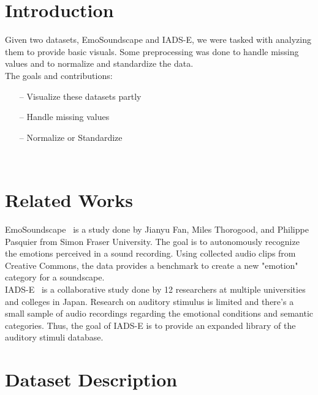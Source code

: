 \documentclass[conference]{IEEEtran}
\begin{document}
{\color{red}
\vspace{-0.1in}
\section{Introduction}
\label{sec:intro}

\noindent
Given two datasets, EmoSoundscape and IADS-E, we were tasked with analyzing them to provide basic visuals. Some preprocessing was done to handle missing values and to normalize and standardize the data. \\

\noindent
The goals and contributions:


\begin{itemize}
    \item[--] Visualize these datasets partly
    \item[--] Handle missing values
    \item[--] Normalize or Standardize
\end{itemize}
\ \

\section{Related Works}

\noindent
EmoSoundscape~\cite{EmoSoundscape} is a study done by Jianyu Fan, Miles Thorogood, and Philippe Pasquier from Simon Fraser University. The goal is to autonomously recognize the emotions perceived in a sound recording. Using collected audio clips from Creative Commons, the data provides a benchmark to create a new "emotion" category for a soundscape. \\

\noindent
IADS-E~\cite{IADSE} is a collaborative study done by 12 researchers at multiple universities and colleges in Japan. Research on auditory stimulus is limited and there's a small sample of audio recordings regarding the emotional conditions and semantic categories. Thus, the goal of IADS-E is to provide an expanded library of the auditory stimuli database. \\

\section{Dataset Description}
\label{sec:dataset}

}
\end{document}
